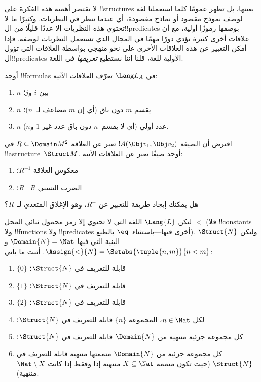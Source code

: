 \documentclass[../../../include/open-logic-section]{subfiles}
\begin{document}
\begin{explain}
لا تقتصر أهمية هذه الفكرة على !!{structure}s بعينها، بل تظهر عمومًا
كلما استعملنا لغة لوصف نموذج مقصود أو نماذج مقصودة، أي عندما ننظر في
النظريات. وكثيرًا ما لا تحتوي هذه النظريات إلا عددًا قليلًا من
ال!!{predicate}s بوصفها رموزًا أولية، مع أن علاقات أخرى كثيرة تؤدي
دورًا مهمًا في المجال الذي تستعمل النظريات لوصفه. فإذا أمكن التعبير
عن هذه العلاقات الأخرى على نحو منهجي بواسطة العلاقات التي تؤول
ال!!{predicate}s الأولية للغة، قلنا إننا نستطيع \emph{تعريفها} في
اللغة.
\end{explain}

\begin{prob}
أوجد !!{formula}s في $\Lang L_A$ تعرّف العلاقات الآتية:
\begin{enumerate}
\item $n$ بين $i$ و$j$؛
\item $n$ يقسم $m$ دون باق (أي إن $m$ مضاعف لـ~$n$)؛
\item $n$ عدد أولي (أي لا يقسم~$n$ دون باق عدد غير $1$ و$n$).
\end{enumerate}
\end{prob}

\begin{prob}
افترض أن الصيغة $!A(\Obj v_1, \Obj v_2)$ تعبر عن العلاقة $R
\subseteq \Domain M^2$ في !!a{structure}~$\Struct M$. أوجد صيغًا
تعبر عن العلاقات الآتية:
\begin{enumerate}
\item معكوس العلاقة $R^{-1}$؛
\item الضرب النسبي $R \mid R$؛
\end{enumerate}
هل يمكنك إيجاد طريقة للتعبير عن $R^+$، وهو الإغلاق المتعدي لـ~$R$؟
\end{prob}

\begin{prob}
لتكن $\Lang{L}$ اللغة التي لا تحتوي إلا رمز محمول ثنائي المحل
$<$ (فلا !!{constant}s ولا !!{function}s ولا !!{predicate}s أخرى
فيها---باستثناء~$\eq$ بالطبع). ولتكن $\Struct{N}$ البنية التي فيها
$\Domain{N} = \Nat$ و$\Assign{<}{N} = \Setabs{\tuple{n,m}}{n <
  m}$. أثبت ما يأتي:
\begin{enumerate}
\item $\{ 0 \}$ قابلة للتعريف في $\Struct{N}$؛
\item $\{ 1 \}$ قابلة للتعريف في $\Struct{N}$؛
\item $\{ 2 \}$ قابلة للتعريف في $\Struct{N}$؛
\item لكل $n \in \Nat$، المجموعة $\{ n \}$ قابلة للتعريف في
  $\Struct{N}$؛
\item كل مجموعة جزئية منتهية من $\Domain{N}$ قابلة للتعريف في
  $\Struct{N}$؛
\item كل مجموعة جزئية من $\Domain{N}$ متممتها منتهية قابلة للتعريف
  في $\Struct{N}$ (حيث تكون متممة $X \subseteq \Nat$ منتهية إذا
  وفقط إذا كانت $\Nat \setminus X$ منتهية).
\end{enumerate}
\end{prob}
\end{document}
